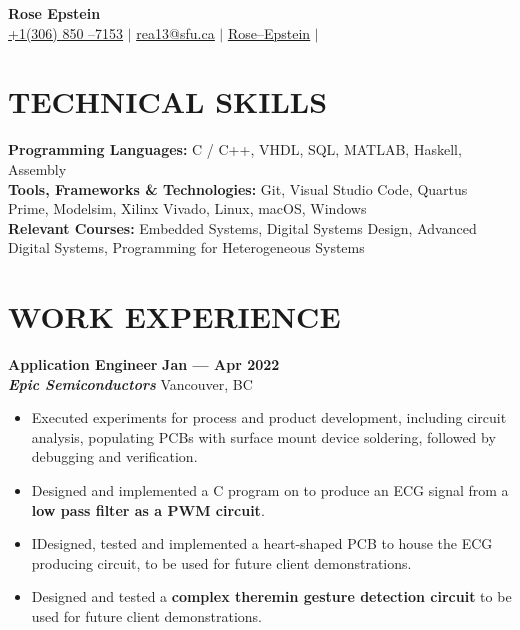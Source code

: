 \documentclass[letterpaper,11pt]{article}
\newcommand{\contact} [4] {
    \begin{center}
        \textbf{\color{colorValue}\Huge #1} \\ \vspace{1pt}
        \small {\faIcon{phone} \underline{#2}} $|$ \href{mailto:#3}{\faIcon{envelope} \underline{#3}} $|$ 
        \href{#4}{\faIcon{linkedin} \underline{Rose--Epstein}} $|$
    \end{center}
}
\newcommand{\Item} [1] {
    \item\small{{#1 \vspace{-2pt}}}
}
\newcommand{\employer} [5] {
    {\textbf{#3} \hfill \textbf{#4 --- #5}\\ \textbf{\emph{#1}} \hfill #2\\}
}
\newcommand{\workItemListStart} [0] {
    \vspace{-1pt}
    \begin{itemize}[topsep=0pt,itemsep=-2pt]
}
\newcommand{\workItemListEnd} [0] {
    \end{itemize}
    \vspace{1pt}
}
\begin{document}
    \vspace*{-30pt}

    \contact{Rose Epstein}{+1(306) 850 --7153}{rea13@sfu.ca}{https://www.linkedin.com/in/rose-epstein/}

    \section{TECHNICAL SKILLS}
    \begin{itemize}[leftmargin=0in, label={}]
    \small{\item{
        \textbf{Programming Languages:}{ C / C++, VHDL, SQL, MATLAB, Haskell, Assembly} \\
        \textbf{Tools, Frameworks \& Technologies:}{ Git, Visual Studio Code, Quartus Prime, Modelsim, Xilinx Vivado, Linux, macOS, Windows} \\
        \textbf{Relevant Courses:}{ Embedded Systems, Digital Systems Design, Advanced Digital Systems, Programming for Heterogeneous Systems} \\
    }}
    \end{itemize}

    \section{WORK EXPERIENCE}
    \employer{Epic Semiconductors}{Vancouver, BC}{Application Engineer}{Jan}{Apr 2022}
    \workItemListStart{}
        \Item{Executed experiments for process and product development, including circuit analysis, populating PCBs with surface mount device soldering, followed by debugging and verification.}
        \Item{Designed and implemented a C program on to produce an ECG signal from a \textbf{low pass filter as a PWM circuit}.}
        \Item{IDesigned, tested and implemented a heart-shaped PCB to house the ECG producing circuit, to be used for future client demonstrations.}
        \Item{Designed and tested a \textbf{complex theremin gesture detection circuit} to be used for future client demonstrations.}
        \workItemListEnd{}
\end{document}
